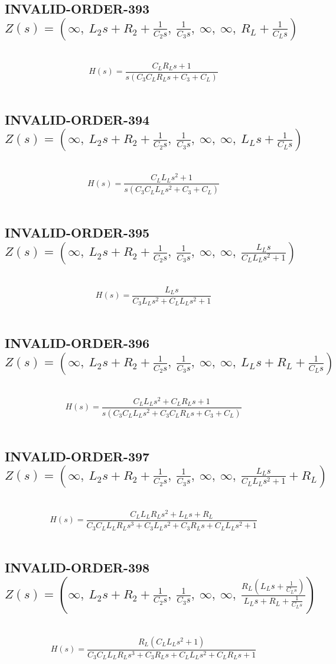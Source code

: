 \documentclass{article}
\begin{document}
\subsection{INVALID-ORDER-393 $Z(s) = \left( \infty, \  L_{2} s + R_{2} + \frac{1}{C_{2} s}, \  \frac{1}{C_{3} s}, \  \infty, \  \infty, \  R_{L} + \frac{1}{C_{L} s}\right)$ } \ 
\textbf{\[H(s) = \frac{C_{L} R_{L} s + 1}{s \left(C_{3} C_{L} R_{L} s + C_{3} + C_{L}\right)}\] } \ 
\subsection{INVALID-ORDER-394 $Z(s) = \left( \infty, \  L_{2} s + R_{2} + \frac{1}{C_{2} s}, \  \frac{1}{C_{3} s}, \  \infty, \  \infty, \  L_{L} s + \frac{1}{C_{L} s}\right)$ } \ 
\textbf{\[H(s) = \frac{C_{L} L_{L} s^{2} + 1}{s \left(C_{3} C_{L} L_{L} s^{2} + C_{3} + C_{L}\right)}\] } \ 
\subsection{INVALID-ORDER-395 $Z(s) = \left( \infty, \  L_{2} s + R_{2} + \frac{1}{C_{2} s}, \  \frac{1}{C_{3} s}, \  \infty, \  \infty, \  \frac{L_{L} s}{C_{L} L_{L} s^{2} + 1}\right)$ } \ 
\textbf{\[H(s) = \frac{L_{L} s}{C_{3} L_{L} s^{2} + C_{L} L_{L} s^{2} + 1}\] } \ 
\subsection{INVALID-ORDER-396 $Z(s) = \left( \infty, \  L_{2} s + R_{2} + \frac{1}{C_{2} s}, \  \frac{1}{C_{3} s}, \  \infty, \  \infty, \  L_{L} s + R_{L} + \frac{1}{C_{L} s}\right)$ } \ 
\textbf{\[H(s) = \frac{C_{L} L_{L} s^{2} + C_{L} R_{L} s + 1}{s \left(C_{3} C_{L} L_{L} s^{2} + C_{3} C_{L} R_{L} s + C_{3} + C_{L}\right)}\] } \ 
\subsection{INVALID-ORDER-397 $Z(s) = \left( \infty, \  L_{2} s + R_{2} + \frac{1}{C_{2} s}, \  \frac{1}{C_{3} s}, \  \infty, \  \infty, \  \frac{L_{L} s}{C_{L} L_{L} s^{2} + 1} + R_{L}\right)$ } \ 
\textbf{\[H(s) = \frac{C_{L} L_{L} R_{L} s^{2} + L_{L} s + R_{L}}{C_{3} C_{L} L_{L} R_{L} s^{3} + C_{3} L_{L} s^{2} + C_{3} R_{L} s + C_{L} L_{L} s^{2} + 1}\] } \ 
\subsection{INVALID-ORDER-398 $Z(s) = \left( \infty, \  L_{2} s + R_{2} + \frac{1}{C_{2} s}, \  \frac{1}{C_{3} s}, \  \infty, \  \infty, \  \frac{R_{L} \left(L_{L} s + \frac{1}{C_{L} s}\right)}{L_{L} s + R_{L} + \frac{1}{C_{L} s}}\right)$ } \ 
\textbf{\[H(s) = \frac{R_{L} \left(C_{L} L_{L} s^{2} + 1\right)}{C_{3} C_{L} L_{L} R_{L} s^{3} + C_{3} R_{L} s + C_{L} L_{L} s^{2} + C_{L} R_{L} s + 1}\] } \ 
\end{document}
